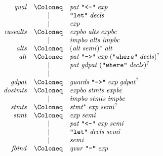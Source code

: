 \begin{align*}
  \begin{array}{rcl}
    \mathit{qual}
    & \Coloneq & \mathit{pat}\; \text{\texttt{\textquotedbl <-\textquotedbl}}\; \mathit{exp} \\
    & \mid & \text{\texttt{\textquotedbl let\textquotedbl}}\; \mathit{decls} \\
    & \mid & \mathit{exp} \\
    \mathit{casealts}
    & \Coloneq & \mathit{expbo}\; \mathit{alts}\; \mathit{expbc} \\
    & \mid & \mathit{impbo}\; \mathit{alts}\; \mathit{impbc} \\
    \mathit{alts}
    & \Coloneq & (\mathit{alt}\; \mathit{semi})^*\; \mathit{alt} \\
    \mathit{alt}
    & \Coloneq & \mathit{pat}\; \text{\texttt{\textquotedbl->\textquotedbl}}\; \mathit{exp}\; (\text{\texttt{\textquotedbl where\textquotedbl}}\; \mathit{decls})^? \\
    & \mid & \mathit{pat}\; \mathit{gdpat}\; (\text{\texttt{\textquotedbl where\textquotedbl}}\; \mathit{decls})^? \\
    & \mid & \\
    \mathit{gdpat}
    & \Coloneq & \mathit{guards}\; \text{\texttt{\textquotedbl->\textquotedbl}}\; \mathit{exp}\; \mathit{gdpat}^? \\
    \mathit{dostmts}
    & \Coloneq & \mathit{expbo}\; \mathit{stmts}\; \mathit{expbc} \\
    & \mid & \mathit{impbo}\; \mathit{stmts}\; \mathit{impbc} \\
    \mathit{stmts}
    & \Coloneq & \mathit{stmt}^*\; \mathit{exp}\; \mathit{semi}^? \\
    \mathit{stmt}
    & \Coloneq & \mathit{exp}\; \mathit{semi} \\
    & \mid & \mathit{pat}\; \text{\texttt{\textquotedbl <-\textquotedbl}}\; \mathit{exp}\; \mathit{semi} \\
    & \mid & \text{\texttt{\textquotedbl let\textquotedbl}}\; \mathit{decls}\; \mathit{semi} \\
    & \mid & \mathit{semi} \\
    \mathit{fbind}
    & \Coloneq & \mathit{qvar}\; \text{\texttt{\textquotedbl =\textquotedbl}}\; \mathit{exp}
  \end{array}
\end{align*}

